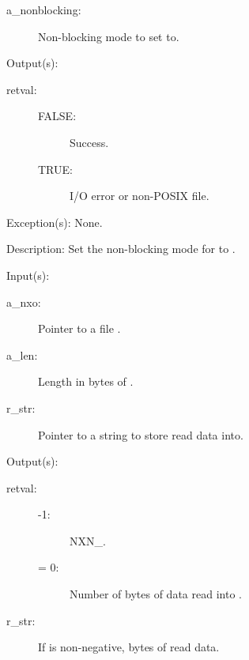 \begin{capi}
\begin{capilist}
\begin{description}
		\item[a\_nonblocking: ]
			Non-blocking mode to set  to.
		\end{description}
	\item[Output(s): ]
		\begin{description}\item[]
		\item[retval: ]
			\begin{description}\item[]
			\item[FALSE: ]
				Success.
			\item[TRUE: ]
				I/O error or non-POSIX file.
			\end{description}
		\end{description}
	\item[Exception(s): ] None.
	\item[Description: ]
		Set the non-blocking mode for  to
		.
	\end{capilist}
\label{nxo_file_read}
	\begin{capilist}
	\item[Input(s): ]
		\begin{description}\item[]
		\item[a\_nxo: ]
			Pointer to a file .
		\item[a\_len: ]
			Length in bytes of .
		\item[r\_str: ]
			Pointer to a string to store read data into.
		\end{description}
	\item[Output(s): ]
		\begin{description}\item[]
		\item[retval: ]
			\begin{description}\item[]
			\item[-1: ]
				NXN\_.
			\item[{\gt}= 0: ]
				Number of bytes of data read into .
			\end{description}\item[]
		\item[r\_str: ]
			If  is non-negative,  bytes of
			read data.

\end{description}
\end{capilist}
\end{capi}
